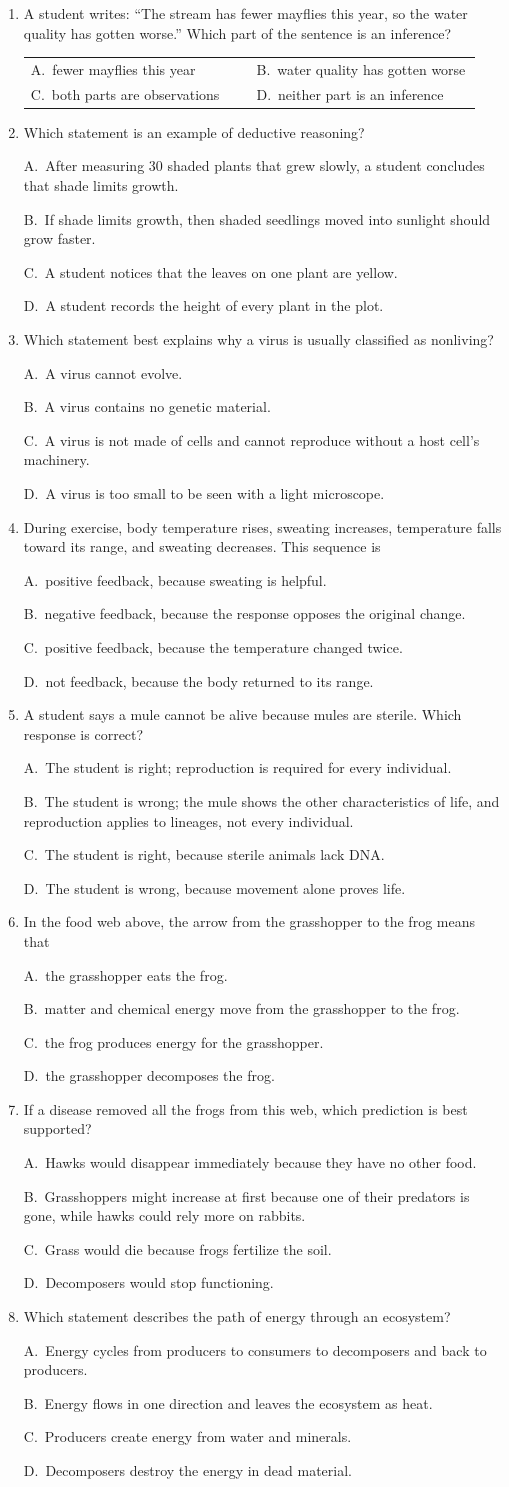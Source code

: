 \documentclass[11pt,letterpaper]{article}
\makeatletter
\newcommand{\mc}[5]{\item #1\par\smallskip\begin{tabularx}{\linewidth}{@{}p{0.47\linewidth}p{0.47\linewidth}@{}}A.\ #2 & B.\ #3\\ C.\ #4 & D.\ #5\end{tabularx}\par}
\newcommand{\mcl}[5]{\item #1\par\smallskip A.\ #2\par B.\ #3\par C.\ #4\par D.\ #5\par}
\makeatother
\begin{document}
\begin{enumerate}[itemsep=4pt]
\mc{A student writes: ``The stream has fewer mayflies this year, so the water quality has gotten worse.'' Which part of the sentence is an inference?}{fewer mayflies this year}{water quality has gotten worse}{both parts are observations}{neither part is an inference}
\mcl{Which statement is an example of deductive reasoning?}{After measuring 30 shaded plants that grew slowly, a student concludes that shade limits growth.}{If shade limits growth, then shaded seedlings moved into sunlight should grow faster.}{A student notices that the leaves on one plant are yellow.}{A student records the height of every plant in the plot.}
\mcl{Which statement best explains why a virus is usually classified as nonliving?}{A virus cannot evolve.}{A virus contains no genetic material.}{A virus is not made of cells and cannot reproduce without a host cell's machinery.}{A virus is too small to be seen with a light microscope.}
\mcl{During exercise, body temperature rises, sweating increases, temperature falls toward its range, and sweating decreases. This sequence is}{positive feedback, because sweating is helpful.}{negative feedback, because the response opposes the original change.}{positive feedback, because the temperature changed twice.}{not feedback, because the body returned to its range.}
\mcl{A student says a mule cannot be alive because mules are sterile. Which response is correct?}{The student is right; reproduction is required for every individual.}{The student is wrong; the mule shows the other characteristics of life, and reproduction applies to lineages, not every individual.}{The student is right, because sterile animals lack DNA.}{The student is wrong, because movement alone proves life.}
\mcl{In the food web above, the arrow from the grasshopper to the frog means that}{the grasshopper eats the frog.}{matter and chemical energy move from the grasshopper to the frog.}{the frog produces energy for the grasshopper.}{the grasshopper decomposes the frog.}
\mcl{If a disease removed all the frogs from this web, which prediction is best supported?}{Hawks would disappear immediately because they have no other food.}{Grasshoppers might increase at first because one of their predators is gone, while hawks could rely more on rabbits.}{Grass would die because frogs fertilize the soil.}{Decomposers would stop functioning.}
\mcl{Which statement describes the path of energy through an ecosystem?}{Energy cycles from producers to consumers to decomposers and back to producers.}{Energy flows in one direction and leaves the ecosystem as heat.}{Producers create energy from water and minerals.}{Decomposers destroy the energy in dead material.}

\end{enumerate}
\end{document}
